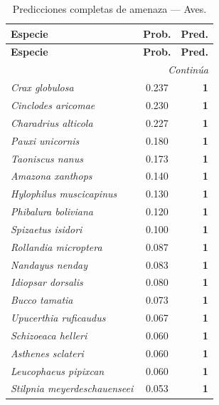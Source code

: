 \documentclass[12pt,a4paper]{article}
\begin{document}
\begin{longtable}{p{6.2cm}cr}
  \caption{Predicciones completas de amenaza --- Aves.} \label{tab:pred_aves} \\
  \toprule
  \textbf{Especie} & \textbf{Prob.} & \textbf{Pred.} \\
  \midrule
  \endfirsthead
  \toprule
  \textbf{Especie} & \textbf{Prob.} & \textbf{Pred.} \\
  \midrule
  \endhead
  \midrule \multicolumn{3}{r}{\textit{Continúa}} \\
  \endfoot
  \bottomrule
  \endlastfoot
  \rowcolor{grisCelda}\textit{Crax globulosa} & 0.237 & \textbf{1} \\
  \rowcolor{grisCelda}\textit{Cinclodes aricomae} & 0.230 & \textbf{1} \\
  \rowcolor{grisCelda}\textit{Charadrius alticola} & 0.227 & \textbf{1} \\
  \rowcolor{grisCelda}\textit{Pauxi unicornis} & 0.180 & \textbf{1} \\
  \rowcolor{grisCelda}\textit{Taoniscus nanus} & 0.173 & \textbf{1} \\
  \rowcolor{grisCelda}\textit{Amazona xanthops} & 0.140 & \textbf{1} \\
  \rowcolor{grisCelda}\textit{Hylophilus muscicapinus} & 0.130 & \textbf{1} \\
  \rowcolor{grisCelda}\textit{Phibalura boliviana} & 0.120 & \textbf{1} \\
  \rowcolor{grisCelda}\textit{Spizaetus isidori} & 0.100 & \textbf{1} \\
  \rowcolor{grisCelda}\textit{Rollandia microptera} & 0.087 & \textbf{1} \\
  \rowcolor{grisCelda}\textit{Nandayus nenday} & 0.083 & \textbf{1} \\
  \rowcolor{grisCelda}\textit{Idiopsar dorsalis} & 0.080 & \textbf{1} \\
  \rowcolor{grisCelda}\textit{Bucco tamatia} & 0.073 & \textbf{1} \\
  \rowcolor{grisCelda}\textit{Upucerthia ruficaudus} & 0.067 & \textbf{1} \\
  \rowcolor{grisCelda}\textit{Schizoeaca helleri} & 0.060 & \textbf{1} \\
  \rowcolor{grisCelda}\textit{Asthenes sclateri} & 0.060 & \textbf{1} \\
  \rowcolor{grisCelda}\textit{Leucophaeus pipixcan} & 0.060 & \textbf{1} \\
  \rowcolor{grisCelda}\textit{Stilpnia meyerdeschauenseei} & 0.053 & \textbf{1} \\

\end{longtable}
\end{document}
